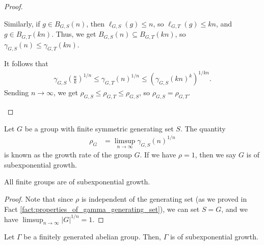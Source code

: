 \begin{proof}
\begin{enumerate}[(1)]
      Similarly, if $g\in B_{G,S}\left(n\right)$, then $\ell_{G,S}\left(g\right)\leq n$, so $\ell_{G,T}\left(g\right) \leq kn$, and $g\in B_{G,T}\left(kn\right)$. Thus, we get $B_{G,S}\left(n\right)\subseteq B_{G,T}\left(kn\right)$, so $\gamma_{G,S}\left(n\right)\leq \gamma_{G,T}\left(kn\right)$.\newline

      It follows that
      \begin{align*}
        \gamma_{G,S}\left(\frac{n}{k}\right)^{1/n} \leq \gamma_{G,T}\left(n\right)^{1/n} \leq \left(\gamma_{G,S}\left(kn\right)^{k}\right)^{1/kn}.
      \end{align*}
      Sending $n\rightarrow\infty$, we get $\rho_{G,S}\leq \rho_{G,T}\leq \rho_{G,S}$, so $\rho_{G,S} = \rho_{G,T}$.
  \end{enumerate}
\end{proof}
\begin{definition}
  Let $G$ be a group with finite symmetric generating set $S$. The quantity
  \begin{align*}
    \rho_{G} &= \limsup_{n\rightarrow\infty}\gamma_{G,S}\left(n\right)^{1/n}
  \end{align*}
  is known as the growth rate of the group $G$. If we have $\rho = 1$, then we say $G$ is of subexponential growth.
\end{definition}
\begin{fact}\label{fact:finite_groups_subexponential_growth}
  All finite groups are of subexponential growth.
\end{fact}
\begin{proof}
Note that since $\rho$ is independent of the generating set (as we proved in Fact \ref{fact:properties_of_gamma_generating_set}), we can set $S = G$, and we have $\limsup_{n\rightarrow\infty} \left\vert G \right\vert^{1/n} = 1$.
\end{proof}
\begin{fact}\label{fact:finitely_generated_abelian_groups_subexponential_growth}
  Let $\Gamma$ be a finitely generated abelian group. Then, $\Gamma$ is of subexponential growth.
\end{fact}
